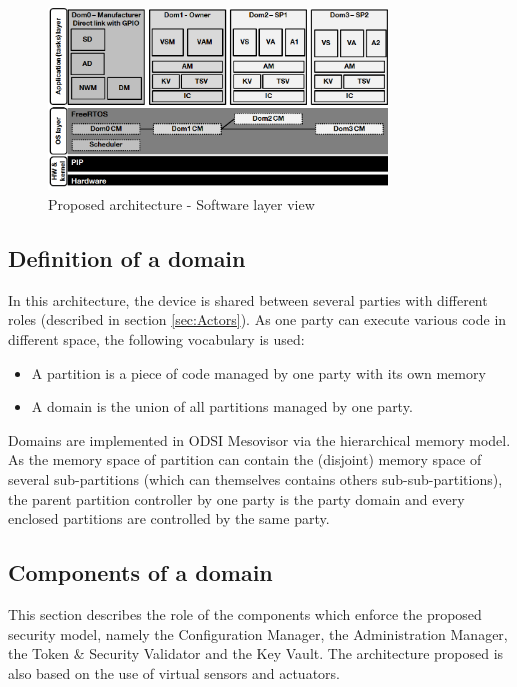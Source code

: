 \documentclass[conference]{IEEEtran}
\begin{document}
\begin{figure}[t]
\centering
\includegraphics[width=9cm]{figures/soft_layer.png}
\caption{Proposed architecture - Software layer view}
\label{fig:Arch_soft}
\end{figure}

\subsection{Definition of a domain}
\label{sec:Domain_def}
In this architecture, the device is shared between several parties with different roles (described in section \ref{sec:Actors}). As one party can execute various code in different space, the following vocabulary is used:
\begin{itemize}
    \item A partition is a piece of code managed by one party with its own memory
    \item A domain is the union of all partitions managed by one party.
\end{itemize}
Domains are implemented in ODSI Mesovisor via the hierarchical memory model. As the memory space of partition can contain the (disjoint) memory space of several sub-partitions (which can themselves contains others sub-sub-partitions), the parent partition controller by one party is the party domain and every enclosed partitions are controlled by the same party.


\subsection{Components of a domain}
\label{sec:Domain_comp}
This section describes the role of the components which enforce the proposed security model, namely the Configuration Manager, the Administration Manager, the Token \& Security Validator and the Key Vault. The architecture proposed is also based on the use of virtual sensors and actuators. 
\end{document}
